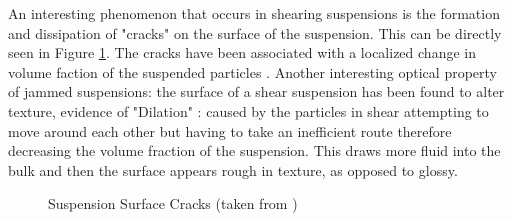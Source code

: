 \documentclass[a4]{report}
\begin{document}
	An interesting phenomenon that occurs in shearing suspensions is the formation and dissipation of "cracks" on the surface of the suspension. This can be directly seen in Figure \ref{cforscracks}. The cracks have been associated with a localized change in volume faction of the suspended particles \cite{backhawjam}. Another interesting optical property of jammed suspensions: the surface of a shear suspension has been found to alter texture, evidence of "Dilation" \cite{backbrownjaegrev}: caused by the particles in shear attempting to move around each other but having to take an inefficient route therefore decreasing the volume fraction of the suspension. This draws more fluid into the bulk and then the surface appears rough in texture, as opposed to glossy. 
\newline \newline \noindent
	\begin{figure}[!h]
		\centering
		\caption{Suspension Surface Cracks (taken from \cite[p.~118]{thescforsyth})}
		\label{cforscracks}
	\end{figure} \newline  \noindent
	
\end{document}
